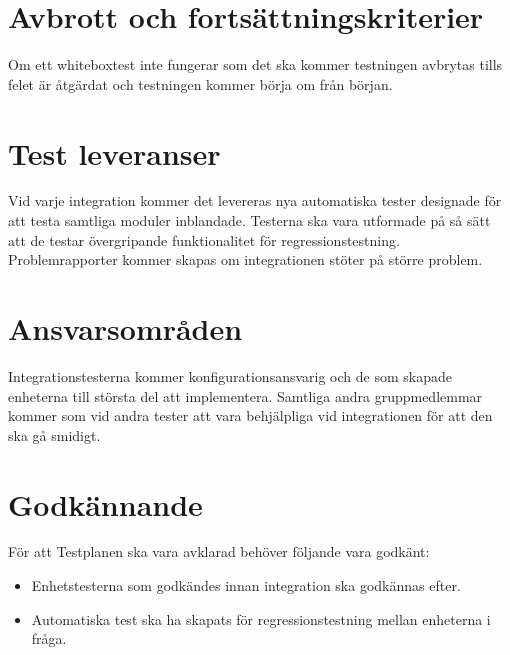 \section{Avbrott och fortsättningskriterier}
	Om ett whiteboxtest inte fungerar som det ska kommer testningen avbrytas tills felet är åtgärdat och testningen kommer börja om från början. 
	


\section{Test leveranser}
	Vid varje integration kommer det levereras nya automatiska tester designade för att testa samtliga moduler inblandade. Testerna ska vara utformade på så sätt att de testar övergripande funktionalitet för regressionstestning. Problemrapporter kommer skapas om integrationen stöter på större problem.

	

	

\section{Ansvarsområden}
	Integrationstesterna kommer konfigurationsansvarig och de som skapade enheterna till största del att implementera. Samtliga andra gruppmedlemmar kommer som vid andra tester att vara behjälpliga vid integrationen för att den ska gå smidigt. 


	
	
	
\section{Godkännande}
	För att Testplanen ska vara avklarad behöver följande vara godkänt:
	\begin{itemize}
	 \item Enhetstesterna som godkändes innan integration ska godkännas efter.
	\item Automatiska test ska ha skapats för regressionstestning mellan enheterna i fråga. 
	\end{itemize}
	



\printbibliography


